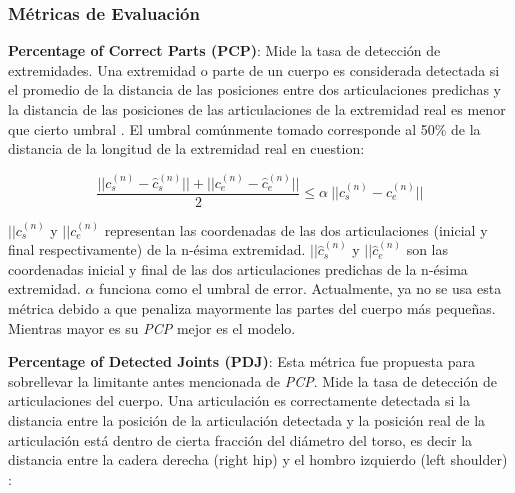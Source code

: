 
\subsubsection{Métricas de Evaluación}

\textbf{Percentage of Correct Parts (PCP)}: Mide la tasa de detección de extremidades. Una extremidad
o parte de un cuerpo es considerada detectada si el promedio de la distancia de las posiciones entre dos
articulaciones predichas y la distancia de las posiciones de las articulaciones de la extremidad real
es menor que cierto umbral \cite{4587468}. El umbral comúnmente tomado corresponde al 50\% de la distancia de la
longitud de la extremidad real en cuestion:

\begin{equation}
    \frac{||c_s^{(n)} - \hat{c}_s^{(n)}|| + ||c_e^{(n)} - \hat{c}_e^{(n)}||}{2} \le \alpha\ || c_s^{(n)} - c_e^{(n)} ||
    \label{eq:PCP}
\end{equation}

$||c_s^{(n)}$ y $||c_e^{(n)}$ representan las coordenadas de las dos articulaciones (inicial y final
respectivamente) de la n-ésima extremidad. $||\hat c_s^{(n)}$ y $||\hat c_e^{(n)}$ son las coordenadas
inicial y final de las dos articulaciones predichas de la n-ésima extremidad. $\alpha$ funciona como
el umbral de error. Actualmente, ya no se usa esta métrica debido a que penaliza mayormente las partes
del cuerpo más pequeñas. Mientras mayor es su \textit{PCP} mejor es el modelo.


\textbf{Percentage of Detected Joints (PDJ)}: Esta métrica fue propuesta para sobrellevar la
limitante antes mencionada de \textit{PCP}. Mide la tasa de detección de articulaciones del cuerpo.
Una articulación es correctamente detectada si la distancia entre la posición de la articulación
detectada y la posición real de la articulación está dentro de cierta fracción del diámetro del torso,
es decir la distancia entre la cadera derecha (right hip) y el hombro izquierdo (left shoulder)
\cite{6619315} \cite{DBLP:journals/corr/ToshevS13}:

